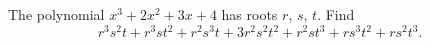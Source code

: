 The polynomial $x^3+2x^2+3x+4$ has roots $r$, $s$, $t$. Find
\[r^3s^2t+r^3st^2+r^2s^3t+3r^2s^2t^2+r^2st^3+rs^3t^2+rs^2t^3.\]
